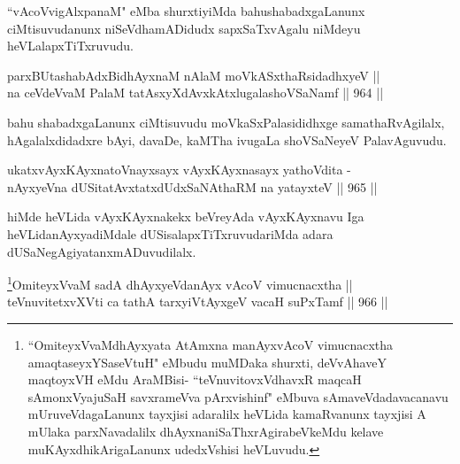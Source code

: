 \begin{artha}
``vAcoVvigAlxpanaM" eMba shurxtiyiMda bahushabadxgaLanunx ciMtisuvudanunx niSeVdhamADidudx sapxSaTxvAgalu niMdeyu heVLalapxTiTxruvudu.
\end{artha}


\begin{shl}
parxBUtashabAdxBidhAyxnaM nAlaM moVkASxthaRsidadhxyeV || \\
na ceVdeVvaM PalaM tatAsxyXdAvxkAtxlugalashoVSaNamf \hfill || 964 ||  
\end{shl}	

\begin{artha}
bahu shabadxgaLanunx ciMtisuvudu moVkaSxPalasididhxge samathaRvAgilalx, hAgalalxdidadxre bAyi, davaDe, kaMTha ivugaLa shoVSaNeyeV PalavAguvudu.
\end{artha}


\begin{shl}
ukatxvAyxKAyxnatoV\s nayxsayx vAyxKAyxnasayx yathoVdita - \\
nAyxyeVna dUSitatAvxtatxdUdxSaNAthaRM na yatayxteV \hfill || 965 ||  
\end{shl}

\begin{artha}
hiMde heVLida vAyxKAyxnakekx beVreyAda vAyxKAyxnavu Iga heVLida\footnotemark[2] nAyxyadiMdale dUSisalapxTiTxruvudariMda adara dUSaNegAgi\break yatanxmADuvudilalx.
\end{artha}


\begin{shl}
\footnote{``OmiteyxVvaMdhAyxyata AtAmxna manAyxvAcoV vimucnacxtha amaqtaseyxYSaseVtuH" eMbudu muMDaka shurxti, deVvAhaveY maqtoyxVH eMdu AraMBisi- ``teVnuvitovxVdhavxR maqcaH sAmonxVyajuSaH savxrameVva pArxvishinf" eMbuva sAmaveVdadavacanavu mUruveVdagaLanunx tayxjisi adaralilx heVLida kamaRvanunx tayxjisi A mUlaka parxNavadalilx dhAyxnaniSaThxrAgirabeVkeMdu kelave muKAyxdhikArigaLanunx udedxVshisi heVLuvudu.}OmiteyxVvaM sadA dhAyxyeVdanAyx vAcoV vimucnacxtha || \\
teV\s nuvitetxvXVti ca tathA tarxyiVtAyxgeV vacaH suPxTamf \hfill || 966 ||  
\end{shl}

